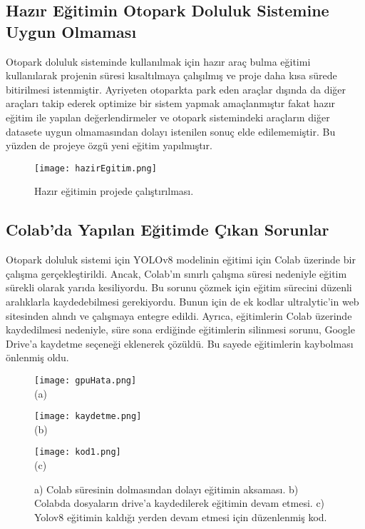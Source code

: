 \documentclass[]{article}
\begin{document}
	\subsection{Hazır Eğitimin Otopark Doluluk Sistemine Uygun Olmaması}
	Otopark doluluk sisteminde kullanılmak için hazır araç bulma eğitimi kullanılarak projenin süresi kısaltılmaya çalışılmış ve proje daha kısa sürede bitirilmesi istenmiştir. Ayriyeten otoparkta park eden araçlar dışında da diğer araçları takip ederek optimize bir sistem yapmak amaçlanmıştır fakat hazır eğitim ile yapılan değerlendirmeler ve otopark sistemindeki araçların diğer datasete uygun olmamasından dolayı istenilen sonuç elde edilememiştir. Bu yüzden de projeye özgü yeni eğitim yapılmıştır\cite{basarasizkod}.
	
	\begin{figure}[!ht]
		\centering
		\texttt{[image: hazirEgitim.png]}
		\caption{Hazır eğitimin projede çalıştırılması.}
	\end{figure}
	
	\subsection{Colab'da Yapılan Eğitimde Çıkan Sorunlar}
	Otopark doluluk sistemi için YOLOv8 modelinin eğitimi için Colab üzerinde bir çalışma gerçekleştirildi. Ancak, Colab'ın sınırlı çalışma süresi nedeniyle eğitim sürekli olarak yarıda kesiliyordu\cite{colab}. Bu sorunu çözmek için eğitim sürecini düzenli aralıklarla kaydedebilmesi gerekiyordu. Bunun için de ek kodlar ultralytic'in web sitesinden alındı ve çalışmaya entegre edildi\cite{kod2}. Ayrıca, eğitimlerin Colab üzerinde kaydedilmesi nedeniyle, süre sona erdiğinde eğitimlerin silinmesi sorunu, Google Drive'a kaydetme seçeneği eklenerek çözüldü. Bu sayede eğitimlerin kaybolması önlenmiş oldu.
	\begin{figure}[htbp]
		\centering
		\begin{minipage}{0.43\textwidth}
			\centering
			\texttt{[image: gpuHata.png]}
			\\
			(a)
		\end{minipage}
		\hfill
		\begin{minipage}{0.43\textwidth}
			\centering
			\texttt{[image: kaydetme.png]}
			\\
			(b)
		\end{minipage}
	\end{figure}
	\begin{figure}[!ht]
		\centering
		\texttt{[image: kod1.png]}
		\\	(c)
		\caption{
			{a) Colab süresinin dolmasından dolayı eğitimin aksaması.}
			{b) Colabda dosyaların drive'a kaydedilerek eğitimin devam etmesi.}
			{c) Yolov8 eğitimin kaldığı yerden devam etmesi için düzenlenmiş kod.}}
	\end{figure}
	
\end{document}
